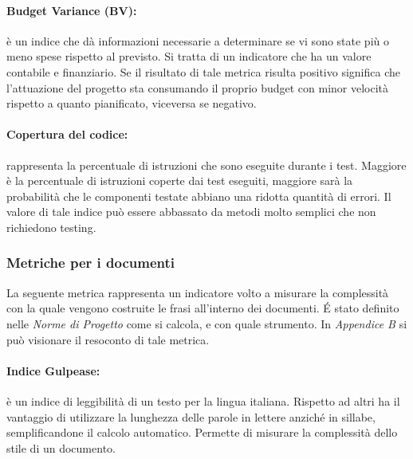 \paragraph{Budget Variance (BV):} è un indice che dà informazioni necessarie a determinare se vi sono state più o meno spese rispetto al previsto. Si tratta di un indicatore che ha un valore contabile e finanziario. Se il risultato di tale metrica risulta positivo significa che l'attuazione del progetto sta consumando il proprio budget con minor velocità rispetto a quanto pianificato, viceversa se negativo.

\paragraph{Copertura del codice:} rappresenta la percentuale di istruzioni che sono eseguite durante i test. Maggiore è la percentuale di istruzioni coperte dai test eseguiti, maggiore sarà la probabilità
che le componenti testate abbiano una ridotta quantità di errori. Il valore di tale indice può essere abbassato da metodi molto semplici che non richiedono testing.

\subsubsection{Metriche per i documenti}
La seguente metrica rappresenta un indicatore volto a misurare la complessità con la quale vengono costruite le frasi all'interno dei documenti.
É stato definito nelle \emph{Norme di Progetto \VersioneNP{}} come si calcola, e con quale strumento. In \emph{Appendice B} si può visionare il resoconto di tale metrica.

\paragraph{Indice Gulpease:} è un indice di leggibilità di un testo per la lingua italiana.
Rispetto ad altri ha il vantaggio di utilizzare la lunghezza delle parole in lettere anziché in sillabe, semplificandone il calcolo automatico. Permette di misurare la complessità dello stile di un documento.

